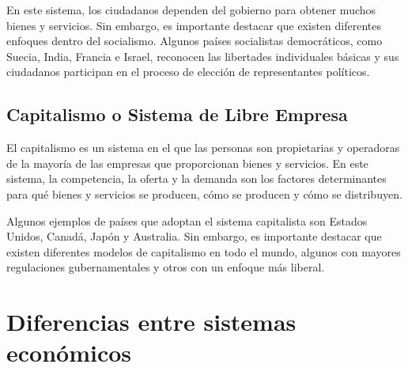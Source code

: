 \documentclass[
  letterpaper,
  DIV=11,
  numbers=noendperiod]{scrartcl}
\begin{document}
En este sistema, los ciudadanos dependen del gobierno para obtener
muchos bienes y servicios. Sin embargo, es importante destacar que
existen diferentes enfoques dentro del socialismo. Algunos países
socialistas democráticos, como Suecia, India, Francia e Israel,
reconocen las libertades individuales básicas y sus ciudadanos
participan en el proceso de elección de representantes políticos.

\hypertarget{capitalismo-o-sistema-de-libre-empresa}{%
\subsection{Capitalismo o Sistema de Libre
Empresa}\label{capitalismo-o-sistema-de-libre-empresa}}

El capitalismo es un sistema en el que las personas son propietarias y
operadoras de la mayoría de las empresas que proporcionan bienes y
servicios. En este sistema, la competencia, la oferta y la demanda son
los factores determinantes para qué bienes y servicios se producen, cómo
se producen y cómo se distribuyen.

Algunos ejemplos de países que adoptan el sistema capitalista son
Estados Unidos, Canadá, Japón y Australia. Sin embargo, es importante
destacar que existen diferentes modelos de capitalismo en todo el mundo,
algunos con mayores regulaciones gubernamentales y otros con un enfoque
más liberal.

\hypertarget{diferencias-entre-sistemas-econuxf3micos}{%
\section{Diferencias entre sistemas
económicos}\label{diferencias-entre-sistemas-econuxf3micos}}
\end{document}
